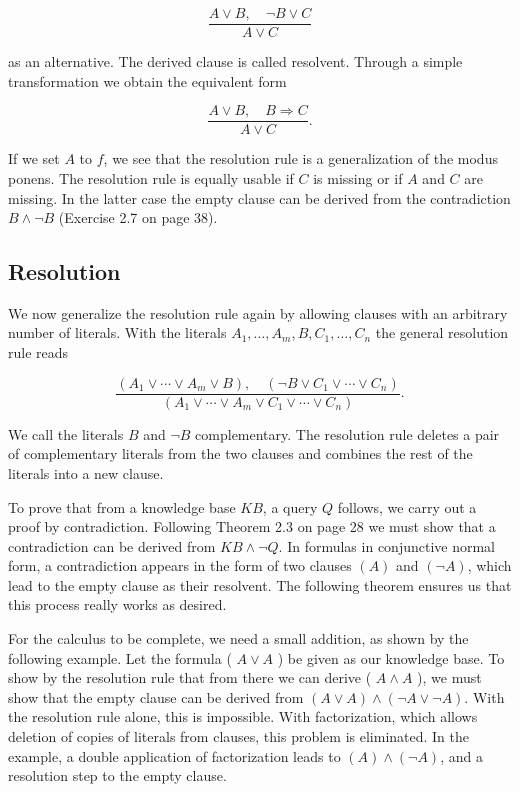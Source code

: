 \documentclass[10pt]{book}
\begin{document}
\begin{equation*}
\frac{A \vee B, \quad \neg B \vee C}{A \vee C} \tag{2.1}
\end{equation*}


as an alternative. The derived clause is called resolvent. Through a simple transformation we obtain the equivalent form

$$
\frac{A \vee B, \quad B \Rightarrow C}{A \vee C} .
$$

If we set $A$ to $f$, we see that the resolution rule is a generalization of the modus ponens. The resolution rule is equally usable if $C$ is missing or if $A$ and $C$ are missing. In the latter case the empty clause can be derived from the contradiction $B \wedge \neg B$ (Exercise 2.7 on page 38).

\subsection*{Resolution}
We now generalize the resolution rule again by allowing clauses with an arbitrary number of literals. With the literals $A_{1}, \ldots, A_{m}, B, C_{1}, \ldots, C_{n}$ the general resolution rule reads


\begin{equation*}
\frac{\left(A_{1} \vee \cdots \vee A_{m} \vee B\right), \quad\left(\neg B \vee C_{1} \vee \cdots \vee C_{n}\right)}{\left(A_{1} \vee \cdots \vee A_{m} \vee C_{1} \vee \cdots \vee C_{n}\right)} . \tag{2.2}
\end{equation*}


We call the literals $B$ and $\neg B$ complementary. The resolution rule deletes a pair of complementary literals from the two clauses and combines the rest of the literals into a new clause.


To prove that from a knowledge base $K B$, a query $Q$ follows, we carry out a proof by contradiction. Following Theorem 2.3 on page 28 we must show that a contradiction can be derived from $K B \wedge \neg Q$. In formulas in conjunctive normal form, a contradiction appears in the form of two clauses $(A)$ and $(\neg A)$, which lead to the empty clause as their resolvent. The following theorem ensures us that this process really works as desired.

For the calculus to be complete, we need a small addition, as shown by the following example. Let the formula ( $A \vee A$ ) be given as our knowledge base. To show by the resolution rule that from there we can derive ( $A \wedge A$ ), we must show that the empty clause can be derived from $(A \vee A) \wedge(\neg A \vee \neg A)$. With the resolution rule alone, this is impossible. With factorization, which allows deletion of copies of literals from clauses, this problem is eliminated. In the example, a double application of factorization leads to $(A) \wedge(\neg A)$, and a resolution step to the empty clause.
\end{document}
